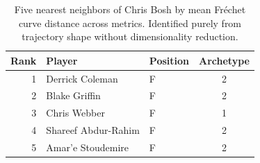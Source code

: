 \begin{table}[htbp]
  \centering\small
  \begin{tabular}{rllc}
    \toprule
    Rank & Player & Position & Archetype \\
    \midrule
    1 & Derrick Coleman & F & 2 \\
    2 & Blake Griffin & F & 2 \\
    3 & Chris Webber & F & 1 \\
    4 & Shareef Abdur-Rahim & F & 2 \\
    5 & Amar'e Stoudemire & F & 2 \\
    \bottomrule
  \end{tabular}
  \caption{Five nearest neighbors of Chris Bosh by mean Fr\'{e}chet curve distance across metrics. Identified purely from trajectory shape without dimensionality reduction.}
  \label{tab:Chris_Bosh_frechet_curve_neighbors}
\end{table}


